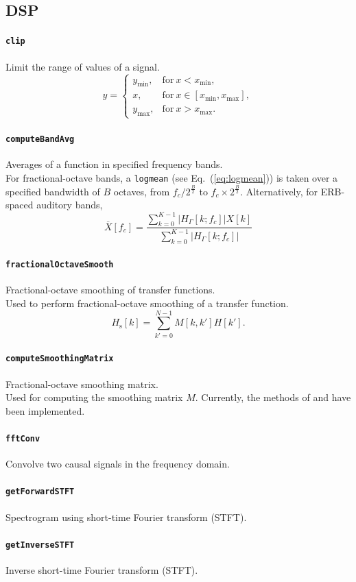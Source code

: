 \documentclass[11pt, oneside]{article}
\newcommand{\eqnref}[1]{Eq.~(\ref{#1})}
\newcommand{\function}[1]{\paragraph*{\texttt{#1}}}
\begin{document}
\subsection{DSP}

\function{clip} Limit the range of values of a signal. \\
\begin{equation}
y =
\begin{cases}
y_\text{min}, & \text{for}~x < x_\text{min}, \\
x, & \text{for}~x \in [x_\text{min}, x_\text{max}], \\
y_\text{max}, & \text{for}~x > x_\text{max}.
\end{cases}
\end{equation}

\function{computeBandAvg} Averages of a function in specified frequency bands. \\
For fractional-octave bands, a \texttt{logmean} (see \eqnref{eq:logmean}) is taken over a specified bandwidth of $B$ octaves, from $f_c / 2^{\frac{B}{2}}$ to $f_c \times 2^{\frac{B}{2}}$.
Alternatively, for ERB-spaced auditory bands,
\begin{equation}
\overline{X}[f_c] = \frac{\displaystyle \sum_{k=0}^{K-1} \left| H_\Gamma[k;f_c] \right| X[k]}{\displaystyle \sum_{k=0}^{K-1} \left| H_\Gamma[k;f_c] \right|}
\end{equation}

\function{fractionalOctaveSmooth} Fractional-octave smoothing of transfer functions. \\
Used to perform fractional-octave smoothing of a transfer function.
\begin{equation}\label{eq:fractionalOctaveSmooth}
H_\text{s}[k] = \sum_{k' = 0}^{N - 1} M[k, k'] H[k'].
\end{equation}

\function{computeSmoothingMatrix} Fractional-octave smoothing matrix. \\
Used for computing the smoothing matrix $M$.
Currently, the methods of \citet{HatziantoniouMourjopoulos2000} and \citet{Tylka2017} have been implemented.

\function{fftConv} Convolve two causal signals in the frequency domain. \\

\function{getForwardSTFT} Spectrogram using short-time Fourier transform (STFT). \\

\function{getInverseSTFT} Inverse short-time Fourier transform (STFT). \\
\end{document}
